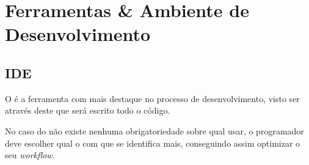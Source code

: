 \chapter{Ferramentas \& Ambiente de Desenvolvimento}


\section{IDE}

O  é a ferramenta com mais destaque no processo de desenvolvimento, visto ser através deste que será escrito todo o código.

No caso do  não existe nenhuma obrigatoriedade sobre qual usar, o programador deve escolher qual o  com que se identifica mais, conseguindo assim optimizar o seu \textit{workflow}.


